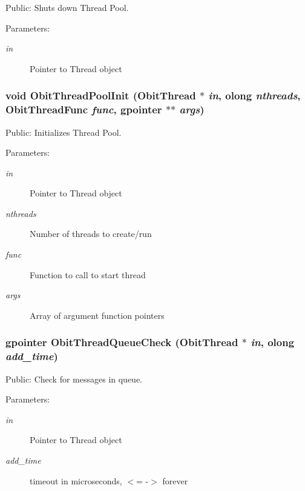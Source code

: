 Public: Shuts down Thread Pool. 

\begin{Desc}
\item[Parameters:]
\begin{description}
\item[{\em in}]Pointer to Thread object \end{description}
\end{Desc}
\subsubsection{\setlength{\rightskip}{0pt plus 5cm}void Obit\-Thread\-Pool\-Init ({\bf Obit\-Thread} $\ast$ {\em in}, {\bf olong} {\em nthreads}, {\bf Obit\-Thread\-Func} {\em func}, gpointer $\ast$$\ast$ {\em args})}\label{ObitThread_8h_a21}


Public: Initializes Thread Pool. 

\begin{Desc}
\item[Parameters:]
\begin{description}
\item[{\em in}]Pointer to Thread object \item[{\em nthreads}]Number of threads to create/run \item[{\em func}]Function to call to start thread \item[{\em args}]Array of argument function pointers \end{description}
\end{Desc}
\subsubsection{\setlength{\rightskip}{0pt plus 5cm}gpointer Obit\-Thread\-Queue\-Check ({\bf Obit\-Thread} $\ast$ {\em in}, {\bf olong} {\em add\_\-time})}\label{ObitThread_8h_a28}


Public: Check for messages in queue. 

\begin{Desc}
\item[Parameters:]
\begin{description}
\item[{\em in}]Pointer to Thread object \item[{\em add\_\-time}]timeout in microseconds, $<$= -$>$ forever \end{description}
\end{Desc}
